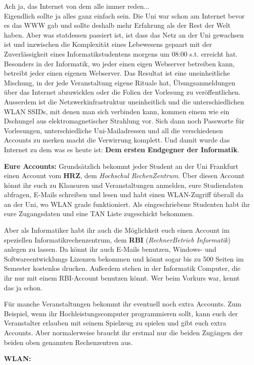 Ach ja, das Internet von dem alle immer reden...\\

\spaltenanfang
Eigendlich sollte ja alles ganz einfach sein.
Die Uni war schon am Internet bevor es das WWW gab und sollte deshalb mehr Erfahrung als der Rest der Welt haben.
Aber was statdessen passiert ist, ist dass das Netz an der Uni gewachsen ist und inzwischen die Komplexit\"at eines Lebewesens gepaart mit der Zuverl\"assigkeit eines Informatikstudentens morgens um 08:00 s.t. erreicht hat. Besonders in der Informatik, wo jeder einen eigen Webserver betreiben kann, betreibt jeder einen eigenen Webserver. Das Resultat ist eine uneinheitliche Mischung, in der jede Veranstaltung eigene Rituale hat, \"Ubungsanmeldungen \"uber das Internet abzuwicklen oder die Folien der Vorlesung zu ver\"offentlichen. Ausserdem ist die Netzwerkinfrastruktur uneinheitlich und die unterschiedlichen WLAN SSIDs, mit denen man sich verbinden kann, kommen einem wie ein Dschungel aus elektromagnetischer Strahlung vor. Sich dann noch Passworte f\"ur Vorlesungen, unterschiedliche Uni-Mailadressen und all die verschiedenen Accounts zu merken macht die Verwirrung komplett.  Und damit wurde das Internet zu dem was es heute ist: \textbf{Dem ersten Endgegner der Informatik}.

\textbf{Eure Accounts:}
Grunds\"atzlich bekommt jeder Student an der Uni Frankfurt einen Account vom \textbf{HRZ}, dem \textit{Hochschul RechenZentrum}.
\"Uber diesen Account k\"onnt ihr euch zu Klausuren und Veranstaltungen anmelden, eure Studiendaten abfragen, E-Mails schreiben und lesen und habt einen WLAN-Zugriff \"uberall da an der Uni, wo WLAN grade funktioniert. Als eingeschriebene Studenten habt ihr eure Zugangsdaten und eine TAN Liste zugeschickt bekommen. 

Aber als Informatiker habt ihr auch die M\"oglichkeit euch einen Account im speziellen Informatikrechenzentrum, dem \textbf{RBI} (\textit{RechnerBetrieb Informatik}) anlegen zu lassen. Da k\"onnt ihr auch E-Mails benutzen, Windows- und Softwareentwicklungs Lizenzen bekommen und k\"onnt sogar bis zu 500 Seiten im Semester kostenlos drucken. Au{\ss}erdem stehen in der Informatik Computer, die ihr nur mit einem RBI-Account benutzen k\"onnt. Wer beim Vorkurs war, kennt das ja schon.

F\"ur manche Veranstaltungen bekommt ihr eventuell noch extra Accounts. Zum Beispiel, wenn ihr Hochleistungscomputer programmieren sollt, kann euch der Veranstalter erlauben mit seinem Spielzeug zu spielen und gibt euch extra Accounts. Aber normalerweise braucht ihr erstmal nur die beiden Zug\"angen der beiden oben genannten Rechenzentren aus.

\textbf{WLAN:}






\spaltenende

